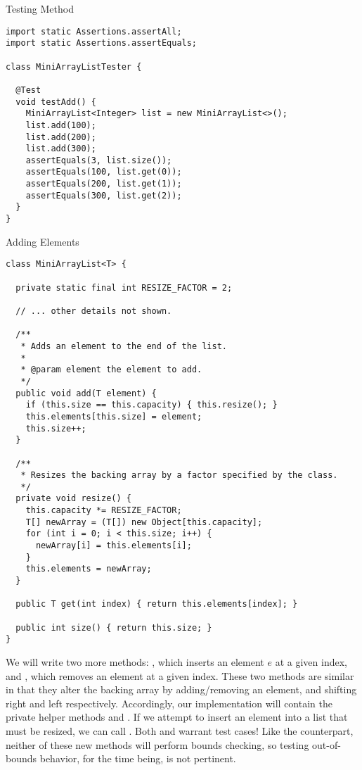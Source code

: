 \begin{cl}{Testing   Method}
\begin{lstlisting}[language=MyJava]
import static Assertions.assertAll;
import static Assertions.assertEquals;

class MiniArrayListTester {

  @Test
  void testAdd() {
    MiniArrayList<Integer> list = new MiniArrayList<>();
    list.add(100);
    list.add(200);
    list.add(300);
    assertEquals(3, list.size());
    assertEquals(100, list.get(0));
    assertEquals(200, list.get(1));
    assertEquals(300, list.get(2));
  }
}
\end{lstlisting}
\end{cl}

\begin{cl}{ Adding Elements}
\begin{lstlisting}[language=MyJava]
class MiniArrayList<T> {

  private static final int RESIZE_FACTOR = 2;

  // ... other details not shown.

  /**
   * Adds an element to the end of the list.
   * 
   * @param element the element to add.
   */
  public void add(T element) {
    if (this.size == this.capacity) { this.resize(); }
    this.elements[this.size] = element;
    this.size++;
  }

  /**
   * Resizes the backing array by a factor specified by the class.
   */
  private void resize() {
    this.capacity *= RESIZE_FACTOR;
    T[] newArray = (T[]) new Object[this.capacity];
    for (int i = 0; i < this.size; i++) {
      newArray[i] = this.elements[i];
    }
    this.elements = newArray;
  }

  public T get(int index) { return this.elements[index]; }

  public int size() { return this.size; }
}
\end{lstlisting}
\end{cl}

We will write two more methods: , which inserts an element $e$ at a given index, and , which removes an element at a given index. These two methods are similar in that they alter the backing array by adding/removing an element, and shifting right and left respectively. Accordingly, our implementation will contain the private helper methods  and . If we attempt to insert an element into a list that must be resized, we can call . Both  and  warrant test cases! Like the  counterpart, neither of these new methods will perform bounds checking, so testing out-of-bounds behavior, for the time being, is not pertinent.

